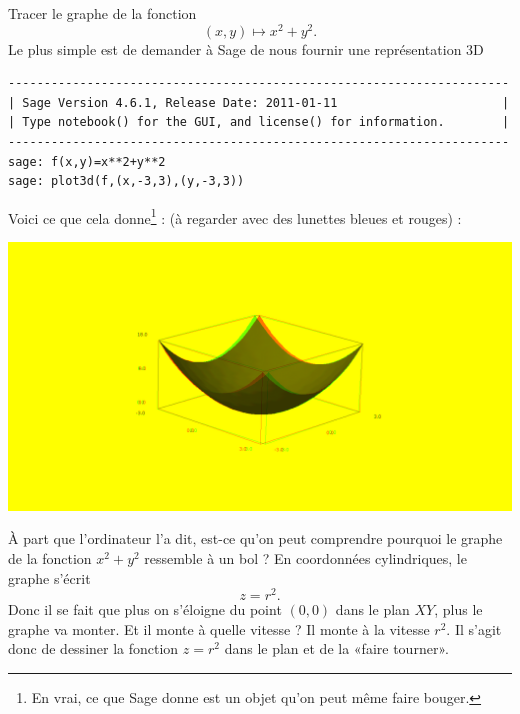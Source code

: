 \begin{example}     \label{ExempleTroisDxxyy}

    Tracer le graphe de la fonction
    \begin{equation}
        (x,y)\mapsto x^2+y^2.
    \end{equation}
    Le plus simple est de demander à Sage de nous fournir une représentation 3D
    \begin{verbatim}
----------------------------------------------------------------------
| Sage Version 4.6.1, Release Date: 2011-01-11                       |
| Type notebook() for the GUI, and license() for information.        |
----------------------------------------------------------------------
sage: f(x,y)=x**2+y**2
sage: plot3d(f,(x,-3,3),(y,-3,3))
    \end{verbatim}

    Voici ce que cela donne\footnote{En vrai, ce que Sage donne est un objet qu'on peut même faire bouger.} : (à regarder avec des lunettes bleues et rouges) :
    \begin{center}
            \includegraphics[width=15cm]{pictures_bitmap/coupe.png}
    \end{center}
    À part que l'ordinateur l'a dit, est-ce qu'on peut comprendre pourquoi le graphe de la fonction $x^2+y^2$ ressemble à un bol ? En coordonnées cylindriques, le graphe s'écrit
    \begin{equation}
        z=r^2.
    \end{equation}
    Donc il se fait que plus on s'éloigne du point $(0,0)$ dans le plan $XY$, plus le graphe va monter. Et il monte à quelle vitesse ? Il monte à la vitesse $r^2$. Il s'agit donc de dessiner la fonction $z=r^2$ dans le plan et de la «faire tourner».

\end{example}

